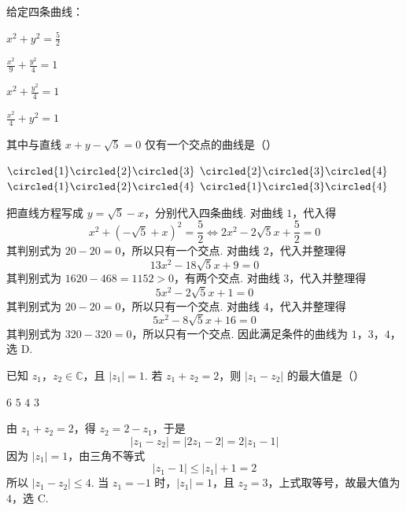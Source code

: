\begin{problem}
给定四条曲线：

\begin{circlelist}
\item \(x^{2}+y^{2}=\frac{5}{2}\)
\item \(\frac{x^{2}}{9}+\frac{y^{2}}{4}=1\)
\item \(x^{2}+\frac{y^{2}}{4}=1\)
\item \(\frac{x^{2}}{4}+y^{2}=1\)
\end{circlelist}

其中与直线 \(x+y-\sqrt{5}=0\) 仅有一个交点的曲线是（\quad）

\choices
    {\(\circled{1}\circled{2}\circled{3}\)}
    {\(\circled{2}\circled{3}\circled{4}\)}
    {\(\circled{1}\circled{2}\circled{4}\)}
    {\(\circled{1}\circled{3}\circled{4}\)}

\begin{solution}
把直线方程写成 \(y=\sqrt5-x\)，分别代入四条曲线. 对曲线 \(1\)，代入得
\[
x^{2}+(-\sqrt5+x)^{2}=\frac52
\Longleftrightarrow 2x^{2}-2\sqrt5x+\frac52=0
\]
其判别式为 \(20-20=0\)，所以只有一个交点. 对曲线 \(2\)，代入并整理得
\[
13x^{2}-18\sqrt5x+9=0
\]
其判别式为 \(1620-468=1152>0\)，有两个交点. 对曲线 \(3\)，代入并整理得
\[
5x^{2}-2\sqrt5x+1=0
\]
其判别式为 \(20-20=0\)，所以只有一个交点. 对曲线 \(4\)，代入并整理得
\[
5x^{2}-8\sqrt5x+16=0
\]
其判别式为 \(320-320=0\)，所以只有一个交点. 因此满足条件的曲线为 \(1\)，\(3\)，\(4\)，选 D.
\end{solution}
\end{problem}

\begin{problem}
已知 \(z_{1}\)，\(z_{2}\in\mathbb{C}\)，且 \(|z_{1}|=1\). 若 \(z_{1}+z_{2}=2\)，则 \(|z_{1}-z_{2}|\) 的最大值是（\quad）

\choices
    {\(6\)}
    {\(5\)}
    {\(4\)}
    {\(3\)}

\begin{solution}
由 \(z_{1}+z_{2}=2\)，得 \(z_{2}=2-z_{1}\)，于是
\[
|z_{1}-z_{2}|=|2z_{1}-2|=2|z_{1}-1|
\]
因为 \(|z_{1}|=1\)，由三角不等式
\[
|z_{1}-1|\leqslant |z_{1}|+1=2
\]
所以 \(|z_{1}-z_{2}|\leqslant4\). 当 \(z_{1}=-1\) 时，\(|z_{1}|=1\)，且 \(z_{2}=3\)，上式取等号，故最大值为 \(4\)，选 C.
\end{solution}
\end{problem}

